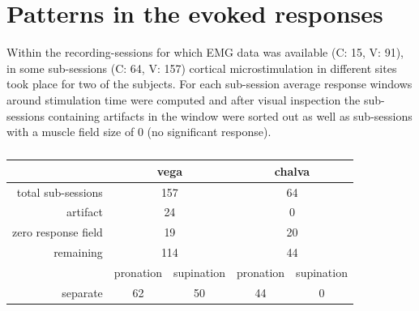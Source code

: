 \section{Patterns in the evoked responses} %
\label{sg:sec:evoked_syns}

Within the recording-sessions for which EMG data was available (C: 15, V: 91), in some sub-sessions (C: 64, V: 157) cortical microstimulation in different sites took place for two of the subjects. For each sub-session average response windows around stimulation time were computed and after visual inspection the sub-sessions containing artifacts in the window were sorted out as well as sub-sessions with a muscle field size of 0 (no significant response). 
\begin{table}[ht]
	\centering
	\begin{tabular}{r|cc|cc}
		\toprule
		                    & \multicolumn{2}{c}{vega}  & \multicolumn{2}{c}{chalva}  \\
	    \midrule
		total sub-sessions  & \multicolumn{2}{c}{157}   & \multicolumn{2}{c}{64}    \\
		artifact            & \multicolumn{2}{c}{24}    & \multicolumn{2}{c}{0}        \\
		zero response field & \multicolumn{2}{c}{19}    & \multicolumn{2}{c}{20}       \\
		\bottomrule
		remaining           & \multicolumn{2}{c}{114}   & \multicolumn{2}{c}{44}       \\
		                    & pronation & supination    & pronation & supination \\
		separate            & 62        & 50            & 44        & 0         \\
		\bottomrule
	\end{tabular}
	\caption{}
	\label{sg:tab:sorting_table_evoked}	
\end{table}

